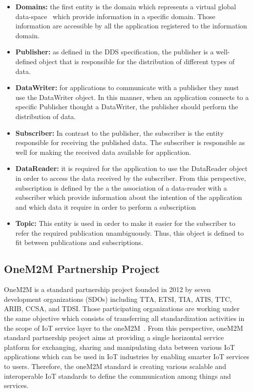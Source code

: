 \begin{itemize}
\item \textbf{Domains:} the first entity is the domain which represents a virtual global data-space~\cite{ssd3} which provide information in a specific domain. Those information are accessible by all the application registered to the information domain.
\item \textbf{Publisher:} as defined in the DDS specification, the publisher is a well-defined object that is responsible for the distribution of different types of data.
\item \textbf{DataWriter:} for applications to communicate with a publisher they must use the DataWriter object. In this manner, when an application connects to a specific Publisher thought a DataWriter, the publisher should perform the distribution of data.
\item \textbf{Subscriber:} In contrast to the publisher, the subscriber is the entity responsible for receiving the published data. The subscriber is responsible as well for making the received data available for application. 
\item \textbf{DataReader:} it is required for the application to use the DataReader object in order to access the data received by the subscriber. From this perspective, subscription is defined by the a the association of a data-reader with a subscriber  which provide information about the intention of the application and which data it require in order to perform a subscription~\cite{ssd} 
\item \textbf{Topic:} This entity is used in order to make it easier for the subscriber to refer the required publication unambiguously. Thus, this object is defined to fit between publications and subscriptions.
\end{itemize}


\subsection{OneM2M Partnership Project}

OneM2M is a standard partnership project founded in 2012 by seven development organizations (SDOs) including TTA, ETSI, TIA,  ATIS,  TTC, ARIB, CCSA, and TDSI. Those participating organizations are working under the same objective which consists of transferring all standardization activities in the scope of IoT service layer to the oneM2M~\cite{onem2mC}. From this perspective, oneM2M standard partnership project aims at providing a single horizontal service platform for exchanging, sharing and manipulating data between various IoT applications which can be used in IoT industries by enabling smarter IoT services to users. Therefore, the oneM2M standard is creating various scalable and interoperable IoT standards to define the communication among things and services.\par 

